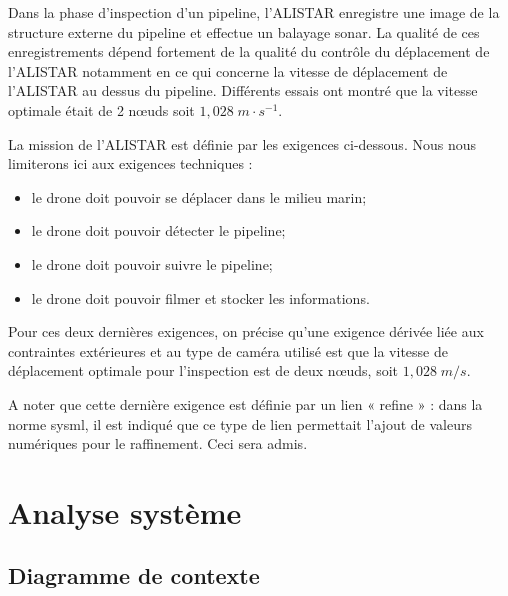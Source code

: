 \documentclass[11pt,oneside]{article}
\begin{document}
{Dans la phase d’inspection d’un pipeline, l’ALISTAR enregistre une image de la structure externe du pipeline et effectue un balayage sonar. La qualité de ces enregistrements dépend fortement de la qualité du contrôle du déplacement de l’ALISTAR notamment en ce qui concerne la vitesse de déplacement de l’ALISTAR au dessus du pipeline. Différents essais ont montré que la vitesse optimale était de 2 nœuds soit $1,028\; m\cdot s^{-1}$.


La mission de l’ALISTAR est définie par les exigences ci-dessous. Nous nous limiterons ici aux exigences techniques :
\begin{itemize}
\item le drone doit pouvoir se déplacer dans le milieu marin;
\item le drone doit pouvoir détecter  le pipeline;
\item le drone doit pouvoir suivre le pipeline;
\item le drone doit pouvoir filmer et stocker les informations.
\end{itemize}

Pour ces deux dernières exigences, on précise qu'une exigence dérivée liée aux contraintes extérieures et au type de caméra utilisé est que la vitesse de déplacement optimale pour l'inspection est de deux nœuds, soit $1,028\;m/s$.

A noter que cette dernière exigence est définie par un lien « refine » : dans la norme sysml, il est indiqué que ce type de lien permettait l'ajout de valeurs numériques pour le raffinement. Ceci sera admis.
}
\section{Analyse système}
\subsection{Diagramme de contexte}
\end{document}
